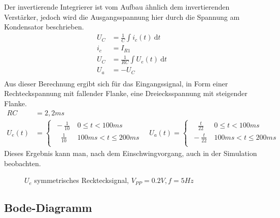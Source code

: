 Der invertierende Integrierer ist vom Aufbau ähnlich dem invertierenden Verstärker, jedoch wird die Ausgangsspannung hier durch die Spannung am Kondensator beschrieben.\\
\begin{align*}
 U_C &= \frac{1}{C} \int i_c(t)\ \mathrm{d}t\\
 i_c &= I_{R1}\\
 U_C &= \frac{1}{RC} \int U_e(t)\ \mathrm{d}t\\
 U_a &= -U_C\\
\end{align*}
\noindent
Aus dieser Berechnung ergibt sich für das Eingangssignal, in Form einer Rechteckspannung mit fallender Flanke, eine Dreiecksspannung mit steigender Flanke.\\
\begin{align*}
 RC &= 2,2ms\\
 U_e(t) &=
  \begin{cases}
   \ -\frac{1}{10}\ &0 \leq t < 100ms\\
   \quad \frac{1}{10}\ &100ms < t \leq 200ms\\
  \end{cases}
  \quad
  U_a(t) =
  \begin{cases}
   \quad \frac{t}{22}\ &0 \leq t < 100ms\\
   \ -\frac{t}{22}\ &100ms < t \leq 200ms\\
  \end{cases}
\end{align*}
\noindent
Dieses Ergebnis kann man, nach dem Einschwingvorgang, auch in der Simulation beobachten.\\

\begin{figure}[H]
  \centering
  \caption{$U_e$ symmetrisches Recktecksignal, $V_{PP}=0.2V, f=5Hz$}
\end{figure}

\subsection{Bode-Diagramm}

